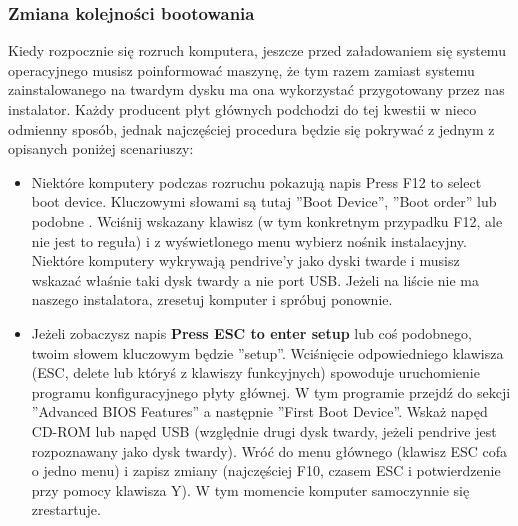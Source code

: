 \subsubsection{Zmiana kolejności bootowania}
Kiedy rozpocznie się rozruch komputera, jeszcze przed załadowaniem się systemu operacyjnego musisz poinformować maszynę, że tym razem  zamiast systemu zainstalowanego na twardym dysku ma ona wykorzystać przygotowany przez nas instalator. Każdy producent płyt głównych podchodzi do tej kwestii w nieco odmienny sposób, jednak najczęściej procedura będzie się pokrywać z jednym z opisanych poniżej scenariuszy:
\begin{itemize}
\item Niektóre komputery podczas rozruchu pokazują napis Press F12 to select boot device. Kluczowymi słowami są tutaj ”Boot Device”, ”Boot order” lub podobne . Wciśnij wskazany klawisz (w tym konkretnym przypadku F12, ale nie jest to reguła) i z wyświetlonego menu wybierz nośnik instalacyjny. Niektóre komputery wykrywają pendrive'y jako dyski twarde i musisz wskazać właśnie taki dysk twardy a nie port USB. Jeżeli na liście nie ma naszego instalatora, zresetuj komputer i spróbuj ponownie.
\item Jeżeli zobaczysz napis \textbf{Press ESC to enter setup} lub coś podobnego, twoim słowem kluczowym będzie ”setup”. Wciśnięcie odpowiedniego klawisza (ESC, delete lub któryś z klawiszy funkcyjnych) spowoduje uruchomienie programu konfiguracyjnego płyty głównej. W tym programie przejdź do sekcji ”Advanced BIOS Features” a następnie ”First Boot Device”. Wskaż napęd CD-ROM lub napęd USB (względnie drugi dysk twardy, jeżeli pendrive jest rozpoznawany jako dysk twardy). Wróć do menu głównego (klawisz ESC cofa o jedno menu) i zapisz zmiany (najczęściej F10, czasem ESC i potwierdzenie przy pomocy klawisza Y). W tym momencie komputer samoczynnie się zrestartuje.
\end{itemize}
